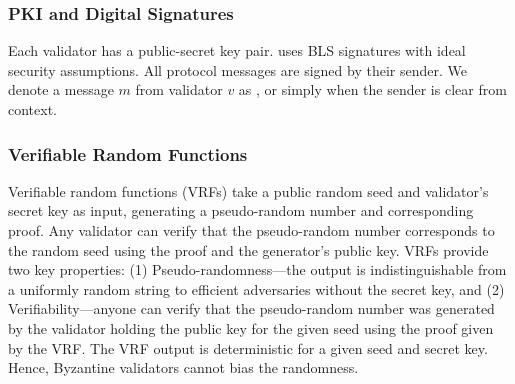 \subsubsection{PKI and Digital Signatures}
Each validator has a public-secret key pair. 
\codename{} uses BLS signatures \cite{BLS01} with ideal security assumptions. 
All protocol messages are signed by their sender. 
We denote a message $m$ from validator $v$ as , or simply  when the sender is clear from context.

 \subsubsection{Verifiable Random Functions}
Verifiable random functions (VRFs) \cite{MVR99} take a public random seed and validator's secret key as input, generating a pseudo-random number and corresponding proof. 
Any validator can verify that the pseudo-random number corresponds to the random seed using the proof and the generator's public key.
VRFs provide two key properties: (1) Pseudo-randomness---the output is indistinguishable from a uniformly random string to efficient adversaries without the secret key, and (2) Verifiability---anyone can verify that the pseudo-random number was generated by the validator holding the public key for the given seed using the proof given by the VRF.
The VRF output is deterministic for a given seed and secret key.
Hence, Byzantine validators cannot bias the randomness. 

